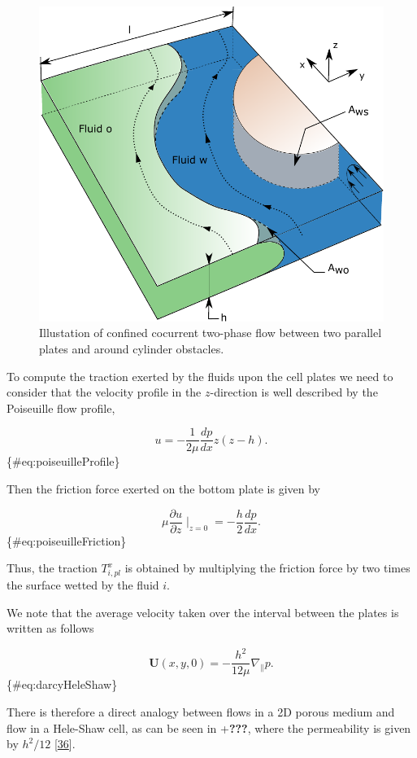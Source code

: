 \documentclass[]{article}
\begin{document}
\begin{figure}
\hypertarget{fig:modelStudy}{%
\centering
\includegraphics{figures/pdf/dessin_courbure.pdf}
\caption{Illustation of confined cocurrent two-phase flow between two
parallel plates and around cylinder obstacles.}\label{fig:modelStudy}
}
\end{figure}

To compute the traction exerted by the fluids upon the cell plates we
need to consider that the velocity profile in the \(z\)-direction is
well described by the Poiseuille flow profile,

\[
u=-\frac{1}{2\mu}\frac{dp}{dx}z(z-h).
\] \{\#eq:poiseuilleProfile\}

Then the friction force exerted on the bottom plate is given by

\[
\mu\frac{\partial u}{\partial z}\mid_{z=0}=-\frac{h}{2}\frac{dp}{dx}.
\] \{\#eq:poiseuilleFriction\}

Thus, the traction \(T_{i,pl}^x\) is obtained by multiplying the
friction force by two times the surface wetted by the fluid \(i\).

We note that the average velocity taken over the interval between the
plates is written as follows

\[
\mathbf{U}(x,y,0)=-\frac{h^{2}}{12\mu}\nabla_{\parallel}p.
\] \{\#eq:darcyHeleShaw\}

There is therefore a direct analogy between flows in a 2D porous medium
and flow in a Hele-Shaw cell, as can be seen in +\textbf{???}, where the
permeability is given by \(h^{2}/12\)
{[}\protect\hyperlink{ref-saffman1958penetration}{36}{]}.
\end{document}
